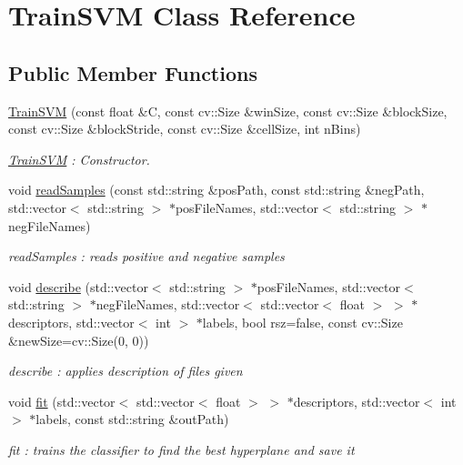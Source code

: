 \hypertarget{classTrainSVM}{}\section{Train\+S\+VM Class Reference}
\label{classTrainSVM}
\subsection*{Public Member Functions}
\begin{DoxyCompactItemize}
\item 
\hyperlink{classTrainSVM_a29ecf4d6835625f07df523abd235ec62}{Train\+S\+VM} (const float \&C, const cv\+::\+Size \&win\+Size, const cv\+::\+Size \&block\+Size, const cv\+::\+Size \&block\+Stride, const cv\+::\+Size \&cell\+Size, int n\+Bins)
\begin{DoxyCompactList}\small\item\em \hyperlink{classTrainSVM}{Train\+S\+VM} \+: Constructor. \end{DoxyCompactList}\item 
void \hyperlink{classTrainSVM_a2b66a0fa34c717c85635641ba3fe33e5}{read\+Samples} (const std\+::string \&pos\+Path, const std\+::string \&neg\+Path, std\+::vector$<$ std\+::string $>$ $\ast$pos\+File\+Names, std\+::vector$<$ std\+::string $>$ $\ast$neg\+File\+Names)
\begin{DoxyCompactList}\small\item\em read\+Samples \+: reads positive and negative samples \end{DoxyCompactList}\item 
void \hyperlink{classTrainSVM_ae277ff97d95ad406edd9986f41d4342e}{describe} (std\+::vector$<$ std\+::string $>$ $\ast$pos\+File\+Names, std\+::vector$<$ std\+::string $>$ $\ast$neg\+File\+Names, std\+::vector$<$ std\+::vector$<$ float $>$ $>$ $\ast$descriptors, std\+::vector$<$ int $>$ $\ast$labels, bool rsz=false, const cv\+::\+Size \&new\+Size=cv\+::\+Size(0, 0))
\begin{DoxyCompactList}\small\item\em describe \+: applies description of files given \end{DoxyCompactList}\item 
void \hyperlink{classTrainSVM_ab615a62534f0d846db008cf93f71f292}{fit} (std\+::vector$<$ std\+::vector$<$ float $>$ $>$ $\ast$descriptors, std\+::vector$<$ int $>$ $\ast$labels, const std\+::string \&out\+Path)
\begin{DoxyCompactList}\small\item\em fit \+: trains the classifier to find the best hyperplane and save it \end{DoxyCompactList}\item 

\end{DoxyCompactItemize}
